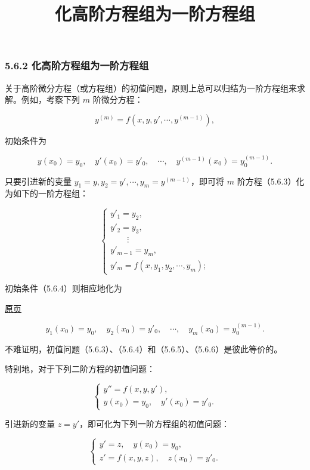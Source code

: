 \documentclass[
  10pt,
  fontset=fandol]{ctexart}
\title{化高阶方程组为一阶方程组}
\author{}
\date{}
\begin{document}
\maketitle

\subsubsection{5.6.2 化高阶方程组为一阶方程组}\label{ux5316ux9ad8ux9636ux65b9ux7a0bux7ec4ux4e3aux4e00ux9636ux65b9ux7a0bux7ec4}

关于高阶微分方程（或方程组）的初值问题，原则上总可以归结为一阶方程组来求解。例如，考察下列 \(m\) 阶微分方程：

\[
y^{(m)}=f(x,y,y',\cdots,y^{(m-1)}),
\tag{5.6.3}
\]

初始条件为

\[
y(x_0)=y_0,\quad y'(x_0)=y'_0,\quad\cdots,\quad y^{(m-1)}(x_0)=y_0^{(m-1)}.
\tag{5.6.4}
\]

只要引进新的变量 \(y_1=y,y_2=y',\cdots,y_m=y^{(m-1)}\)，即可将 \(m\) 阶方程（5.6.3）化为如下的一阶方程组：

\[
\begin{cases}
y'_1=y_2,\\
y'_2=y_3,\\
\qquad\vdots\\
y'_{m-1}=y_m,\\
y'_m=f(x,y_1,y_2,\cdots,y_m);
\end{cases}
\tag{5.6.5}
\]

初始条件（5.6.4）则相应地化为

\href{../../source-images/pdf-147.jpeg}{原页}

\[
y_1(x_0)=y_0,\quad y_2(x_0)=y'_0,\quad\cdots,\quad y_m(x_0)=y_0^{(m-1)}.
\tag{5.6.6}
\]

不难证明，初值问题（5.6.3）、（5.6.4）和（5.6.5）、（5.6.6）是彼此等价的。

特别地，对于下列二阶方程的初值问题：

\[
\begin{cases}
y''=f(x,y,y'),\\
y(x_0)=y_0,\quad y'(x_0)=y'_0.
\end{cases}
\]

引进新的变量 \(z=y'\)，即可化为下列一阶方程组的初值问题：

\[
\begin{cases}
y'=z,\quad y(x_0)=y_0,\\
z'=f(x,y,z),\quad z(x_0)=y'_0.
\end{cases}
\]
\end{document}
